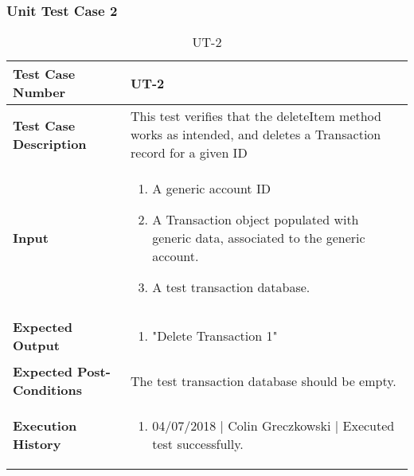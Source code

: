 \documentclass[12pt]{article}
\begin{document}
\subsubsection{Unit Test Case 2} \label{tc:2}
\def\arraystretch{1.5}%
\begin{table}[htbp]
\centering
\caption {UT-2}
\label{UT-2}
\begin{tabularx}{\textwidth}{ | l | X |}
\hline
\textbf{Test Case Number}      &  UT-2                         \\ \hline
\textbf{Test Case Description}    &  This test verifies that the deleteItem method works as intended, and deletes a Transaction record for a given ID                \\ \hline
\textbf{Input}         & 	\begin{enumerate}
          \item A generic account ID
	\item A Transaction object populated with generic data, associated to the generic account.
	\item A test transaction database.
\end{enumerate} \\ \hline

\textbf{Expected Output}     & \begin{enumerate}
	\item "Delete Transaction 1"
\end{enumerate} \\ \hline
\textbf{Expected Post-Conditions}           & The test transaction database should be empty.                \\ \hline
\textbf{Execution History}   &  \begin{enumerate}
	\item 04/07/2018 | Colin Greczkowski | Executed test successfully.
\end {enumerate} \\ \hline
\end{tabularx}
\end{table}
\clearpage
\end{document}
